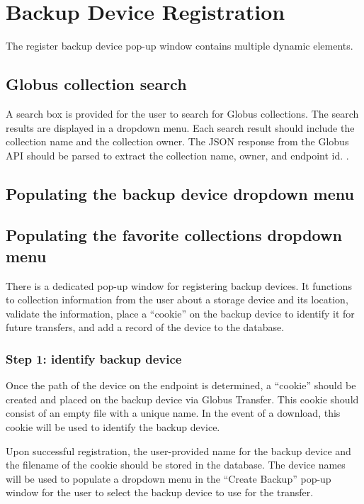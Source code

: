 
\section{Backup Device Registration}

The register backup device pop-up window contains multiple dynamic elements.

\subsection{Globus collection search}

A search box is provided for the user to search for Globus collections. The search
results are displayed in a dropdown menu. Each search result should include the
collection name and the collection owner. The JSON response from the Globus
API should be parsed to extract the collection name, owner, and endpoint
id. .


\subsection{Populating the backup device dropdown menu}

\subsection{Populating the favorite collections dropdown menu}

There is a dedicated pop-up window for registering backup devices. It functions
to collection information from the user about a storage device and its location,
validate the information, place a ``cookie'' on the backup device to identify it 
for future transfers, and add a record of the device to the database.

\subsubsection{Step 1: identify backup device}

Once the path of the device on the endpoint is determined, a ``cookie'' 
should be created and placed on the backup device via Globus Transfer. This cookie 
should consist of an empty file with a unique name. In the event of a download, this 
cookie will be used to identify the backup device.

Upon successful registration, the user-provided name for the backup device and the 
filename of the cookie should be stored in the database. The device names will be 
used to populate a dropdown menu in the ``Create Backup'' pop-up window for the
user to select the backup device to use for the transfer.

